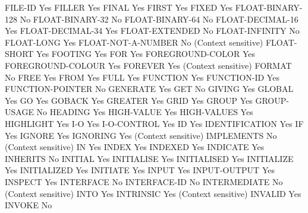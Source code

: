 FILE-ID                         Yes
FILLER                          Yes
FINAL                           Yes
FIRST                           Yes
FIXED                           Yes
FLOAT-BINARY-128                No
FLOAT-BINARY-32                 No
FLOAT-BINARY-64                 No
FLOAT-DECIMAL-16                Yes
FLOAT-DECIMAL-34                Yes
FLOAT-EXTENDED                  No
FLOAT-INFINITY                  No
FLOAT-LONG                      Yes
FLOAT-NOT-A-NUMBER              No (Context sensitive)
FLOAT-SHORT                     Yes
FOOTING                         Yes
FOR                             Yes
FOREGROUND-COLOR                Yes
FOREGROUND-COLOUR               Yes
FOREVER                         Yes (Context sensitive)
FORMAT                          No
FREE                            Yes
FROM                            Yes
FULL                            Yes
FUNCTION                        Yes
FUNCTION-ID                     Yes
FUNCTION-POINTER                No
GENERATE                        Yes
GET                             No
GIVING                          Yes
GLOBAL                          Yes
GO                              Yes
GOBACK                          Yes
GREATER                         Yes
GRID                            Yes
GROUP                           Yes
GROUP-USAGE                     No
HEADING                         Yes
HIGH-VALUE                      Yes
HIGH-VALUES                     Yes
HIGHLIGHT                       Yes
I-O                             Yes
I-O-CONTROL                     Yes
ID                              Yes
IDENTIFICATION                  Yes
IF                              Yes
IGNORE                          Yes
IGNORING                        Yes (Context sensitive)
IMPLEMENTS                      No (Context sensitive)
IN                              Yes
INDEX                           Yes
INDEXED                         Yes
INDICATE                        Yes
INHERITS                        No
INITIAL                         Yes
INITIALISE                      Yes
INITIALISED                     Yes
INITIALIZE                      Yes
INITIALIZED                     Yes
INITIATE                        Yes
INPUT                           Yes
INPUT-OUTPUT                    Yes
INSPECT                         Yes
INTERFACE                       No
INTERFACE-ID                    No
INTERMEDIATE                    No (Context sensitive)
INTO                            Yes
INTRINSIC                       Yes (Context sensitive)
INVALID                         Yes
INVOKE                          No
